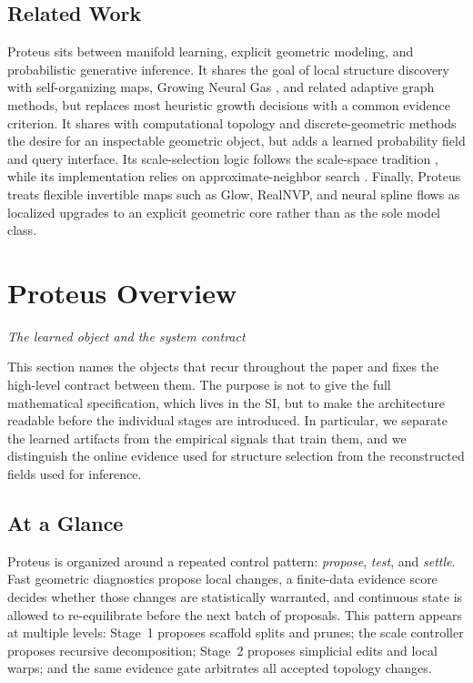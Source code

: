 \documentclass[11pt]{article}
\newcommand{\sectionsubtitle}[1]{\vspace{-0.25em}\noindent\textit{#1}\par\vspace{0.75em}}
\theoremstyle{definition}
\theoremstyle{plain}
\begin{document}
\subsection{Related Work}
Proteus sits between manifold learning, explicit geometric modeling, and probabilistic generative inference. It shares the goal of local structure discovery with self-organizing maps, Growing Neural Gas \cite{fritzke1995gng}, and related adaptive graph methods, but replaces most heuristic growth decisions with a common evidence criterion. It shares with computational topology \cite{edelsbrunner2010computational} and discrete-geometric methods \cite{desbrun2005dec} the desire for an inspectable geometric object, but adds a learned probability field and query interface. Its scale-selection logic follows the scale-space tradition \cite{lindeberg1994scale,lindeberg1998scale}, while its implementation relies on approximate-neighbor search \cite{malkov2018hnsw}. Finally, Proteus treats flexible invertible maps such as Glow, RealNVP, and neural spline flows \cite{kingma2018glow,dinh2016realnvp,durkan2019neural} as localized upgrades to an explicit geometric core rather than as the sole model class.

\section{Proteus Overview}
\label{sec:overview}
\sectionsubtitle{The learned object and the system contract}

This section names the objects that recur throughout the paper and fixes the high-level contract between them. The purpose is not to give the full mathematical specification, which lives in the SI, but to make the architecture readable before the individual stages are introduced. In particular, we separate the learned artifacts from the empirical signals that train them, and we distinguish the online evidence used for structure selection from the reconstructed fields used for inference.

\subsection{At a Glance}
Proteus is organized around a repeated control pattern: \emph{propose}, \emph{test}, and \emph{settle}. Fast geometric diagnostics propose local changes, a finite-data evidence score decides whether those changes are statistically warranted, and continuous state is allowed to re-equilibrate before the next batch of proposals. This pattern appears at multiple levels: Stage~1 proposes scaffold splits and prunes; the scale controller proposes recursive decomposition; Stage~2 proposes simplicial edits and local warps; and the same evidence gate arbitrates all accepted topology changes.
\end{document}
